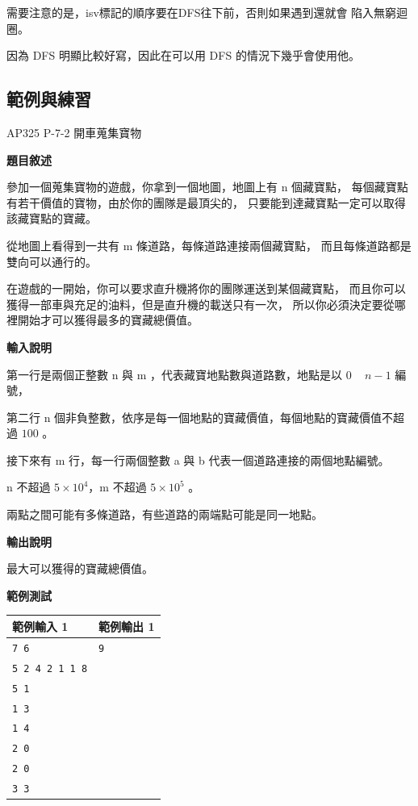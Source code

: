    需要注意的是，isv標記的順序要在DFS往下前，否則如果遇到還就會
    陷入無窮迴圈。

    因為 DFS 明顯比較好寫，因此在可以用 DFS 的情況下幾乎會使用他。

    \subsection{範例與練習}

    \example AP325 P-7-2 開車蒐集寶物

    \textbf{題目敘述}

    參加一個蒐集寶物的遊戲，你拿到一個地圖，地圖上有 n 個藏寶點，
    每個藏寶點有若干價值的寶物，由於你的團隊是最頂尖的，
    只要能到達藏寶點一定可以取得該藏寶點的寶藏。

    從地圖上看得到一共有 m 條道路，每條道路連接兩個藏寶點，
    而且每條道路都是雙向可以通行的。

    在遊戲的一開始，你可以要求直升機將你的團隊運送到某個藏寶點，
    而且你可以獲得一部車與充足的油料，但是直升機的載送只有一次，
    所以你必須決定要從哪裡開始才可以獲得最多的寶藏總價值。

    \textbf{輸入說明}

    第一行是兩個正整數 n 與 m ，代表藏寶地點數與道路數，地點是以 $0$ ~ $n−1$ 編號，

    第二行 n 個非負整數，依序是每一個地點的寶藏價值，每個地點的寶藏價值不超過 $100$ 。

    接下來有 m 行，每一行兩個整數 a 與 b 代表一個道路連接的兩個地點編號。

    n 不超過 $5 \times 10^4$，m 不超過 $5 \times 10^5$ 。

    兩點之間可能有多條道路，有些道路的兩端點可能是同一地點。
    
    \textbf{輸出說明}

    最大可以獲得的寶藏總價值。

    \textbf{範例測試}

    \begin{tabular}{|m{7cm}|m{7cm}|}
        \hline
        範例輸入 1 & 範例輸出 1 \\
        \hline
        \verb|7 6|  & \verb|9| \\
        \verb|5 2 4 2 1 1 8|  & \\
        \verb|5 1|  & \\
        \verb|1 3|  & \\
        \verb|1 4|  & \\
        \verb|2 0| & \\
        \verb|2 0|  & \\
        \verb|3 3|  & \\
        \hline
    \end{tabular}

